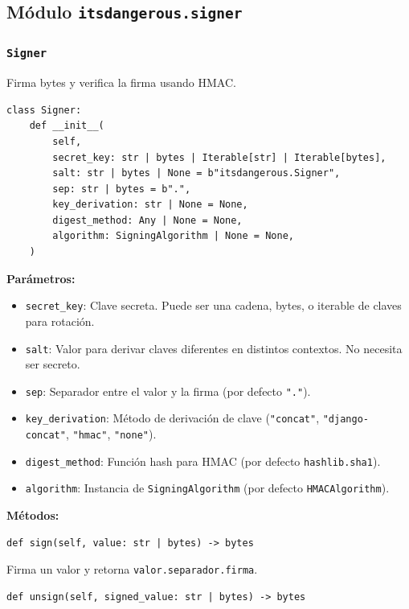 \documentclass[11pt,a4paper]{article}
\begin{document}
\subsection*{Módulo \texttt{itsdangerous.signer}}


\subsubsection*{\texttt{Signer}}


Firma bytes y verifica la firma usando HMAC.


\begin{lstlisting}
class Signer:
    def __init__(
        self,
        secret_key: str | bytes | Iterable[str] | Iterable[bytes],
        salt: str | bytes | None = b"itsdangerous.Signer",
        sep: str | bytes = b".",
        key_derivation: str | None = None,
        digest_method: Any | None = None,
        algorithm: SigningAlgorithm | None = None,
    )
\end{lstlisting}


\textbf{Parámetros:}


\begin{itemize}[leftmargin=*,topsep=2pt,itemsep=1pt]
  \item \texttt{secret\_key}: Clave secreta. Puede ser una cadena, bytes, o iterable de claves para rotación.
  \item \texttt{salt}: Valor para derivar claves diferentes en distintos contextos. No necesita ser secreto.
  \item \texttt{sep}: Separador entre el valor y la firma (por defecto \texttt{"."}).
  \item \texttt{key\_derivation}: Método de derivación de clave (\texttt{"concat"}, \texttt{"django-concat"}, \texttt{"hmac"}, \texttt{"none"}).
  \item \texttt{digest\_method}: Función hash para HMAC (por defecto \texttt{hashlib.sha1}).
  \item \texttt{algorithm}: Instancia de \texttt{SigningAlgorithm} (por defecto \texttt{HMACAlgorithm}).
\end{itemize}


\textbf{Métodos:}


\begin{lstlisting}
def sign(self, value: str | bytes) -> bytes
\end{lstlisting}


Firma un valor y retorna \texttt{valor.separador.firma}.


\begin{lstlisting}
def unsign(self, signed_value: str | bytes) -> bytes
\end{lstlisting}
\end{document}

